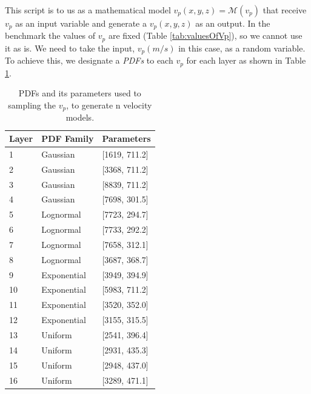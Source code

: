 This script is to us as a mathematical model $v_{p}(x,y,z) = \mathcal{M}(v_{p})$ that receive $v_{p}$ as an input variable and generate a $v_{p}(x,y,z)$ as an output. In the benchmark the values of $v_{p}$ are fixed (Table \ref{tab:valuesOfVp}), so we cannot use it as is. We need to take the input, $v_{p}(m/s)$  in this case, as a random variable. To achieve this, we designate a \textit{PDFs} to each $v_{p}$ for each layer as shown in Table \ref{tab:PDFsOfVp}.

\begin{table}
\begin{center}
    \begin{tabular}{|l|l|l|}
    \hline
    \textbf{Layer} & \textbf{PDF Family}                & \textbf{Parameters}           \\ \hline
    1     & Gaussian & [1619, 711.2] \\ \hline
    2     & Gaussian & [3368, 711.2]               \\ \hline
    3     & Gaussian & [8839, 711.2]               \\ \hline
    4     & Gaussian & [7698, 301.5]               \\ \hline
    5     & Lognormal   & [7723, 294.7]               \\ \hline
    6     & Lognormal   & [7733, 292.2]               \\ \hline
    7     & Lognormal   & [7658, 312.1]               \\ \hline
    8     & Lognormal   & [3687, 368.7]               \\ \hline
    9     & Exponential & [3949, 394.9]             \\ \hline
    10   & Exponential & [5983, 711.2]               \\ \hline
    11   & Exponential & [3520, 352.0]              \\ \hline
    12   & Exponential & [3155, 315.5]              \\ \hline
    13   & Uniform     & [2541, 396.4]              \\ \hline
    14   & Uniform     & [2931, 435.3]              \\ \hline
    15   & Uniform     & [2948, 437.0]             \\ \hline
    16   & Uniform     & [3289, 471.1]              \\ \hline
    \end{tabular}
    \caption {PDFs and its parameters used to sampling the $v_{p}$, to generate n velocity models.}
    \label{tab:PDFsOfVp}
    \end{center}
\end{table}

